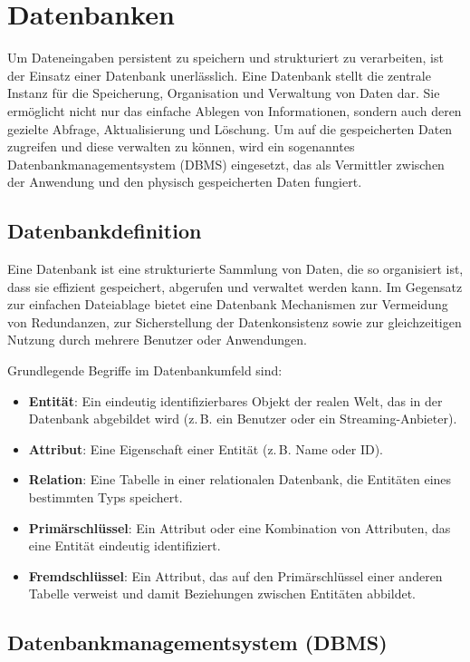 \section{Datenbanken}
Um Dateneingaben persistent zu speichern und strukturiert zu verarbeiten, ist der
Einsatz einer Datenbank unerlässlich. Eine Datenbank stellt die zentrale Instanz
für die Speicherung, Organisation und Verwaltung von Daten dar. Sie ermöglicht
nicht nur das einfache Ablegen von Informationen, sondern auch deren gezielte
Abfrage, Aktualisierung und Löschung. Um auf die gespeicherten Daten zugreifen
und diese verwalten zu können, wird ein sogenanntes Datenbankmanagementsystem
(DBMS) eingesetzt, das als Vermittler zwischen der Anwendung und den physisch
gespeicherten Daten fungiert.

\subsection{Datenbankdefinition}
Eine Datenbank ist eine strukturierte Sammlung von Daten, die so organisiert ist,
dass sie effizient gespeichert, abgerufen und verwaltet werden kann. Im
Gegensatz zur einfachen Dateiablage bietet eine Datenbank Mechanismen zur
Vermeidung von Redundanzen, zur Sicherstellung der Datenkonsistenz sowie zur
gleichzeitigen Nutzung durch mehrere Benutzer oder Anwendungen.

Grundlegende Begriffe im Datenbankumfeld sind:

\begin{itemize}
    \item \textbf{Entität}: Ein eindeutig identifizierbares Objekt der realen Welt,
    das in der Datenbank abgebildet wird (z.\,B. ein Benutzer oder ein
    Streaming-Anbieter).
    \item \textbf{Attribut}: Eine Eigenschaft einer Entität (z.\,B. Name oder ID).
    \item \textbf{Relation}: Eine Tabelle in einer relationalen Datenbank, die
    Entitäten eines bestimmten Typs speichert.
    \item \textbf{Primärschlüssel}: Ein Attribut oder eine Kombination von
    Attributen, das eine Entität eindeutig identifiziert.
    \item \textbf{Fremdschlüssel}: Ein Attribut, das auf den Primärschlüssel einer
    anderen Tabelle verweist und damit Beziehungen zwischen Entitäten abbildet.
\end{itemize}



\subsection{Datenbankmanagementsystem (DBMS)}

